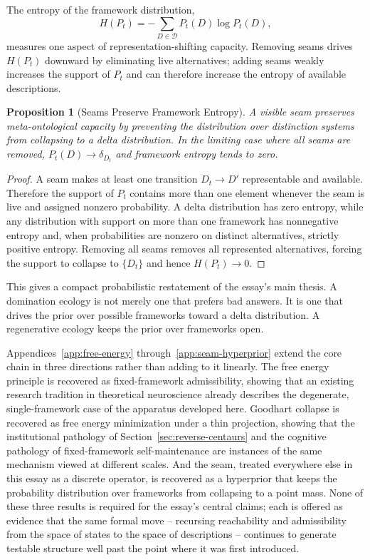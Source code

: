 \documentclass[11pt]{article}
\theoremstyle{plain}
\newtheorem{proposition}{Proposition}[section]
\begin{document}
The entropy of the framework distribution,
\[
H(P_t) = -\sum_{D \in \mathcal{D}} P_t(D) \log P_t(D),
\]
measures one aspect of representation-shifting capacity. Removing seams drives $H(P_t)$ downward by eliminating live alternatives; adding seams weakly increases the support of $P_t$ and can therefore increase the entropy of available descriptions.

\begin{proposition}[Seams Preserve Framework Entropy]
A visible seam preserves meta-ontological capacity by preventing the distribution over distinction systems from collapsing to a delta distribution. In the limiting case where all seams are removed, $P_t(D) \to \delta_{D_t}$ and framework entropy tends to zero.
\end{proposition}
\begin{proof}
A seam makes at least one transition $D_t \to D'$ representable and available. Therefore the support of $P_t$ contains more than one element whenever the seam is live and assigned nonzero probability. A delta distribution has zero entropy, while any distribution with support on more than one framework has nonnegative entropy and, when probabilities are nonzero on distinct alternatives, strictly positive entropy. Removing all seams removes all represented alternatives, forcing the support to collapse to $\{D_t\}$ and hence $H(P_t) \to 0$.
\end{proof}

This gives a compact probabilistic restatement of the essay's main thesis. A domination ecology is not merely one that prefers bad answers. It is one that drives the prior over possible frameworks toward a delta distribution. A regenerative ecology keeps the prior over frameworks open.

\noindent Appendices~\ref{app:free-energy} through~\ref{app:seam-hyperprior} extend the core chain in three directions rather than adding to it linearly. The free energy principle is recovered as fixed-framework admissibility, showing that an existing research tradition in theoretical neuroscience already describes the degenerate, single-framework case of the apparatus developed here. Goodhart collapse is recovered as free energy minimization under a thin projection, showing that the institutional pathology of Section~\ref{sec:reverse-centaurs} and the cognitive pathology of fixed-framework self-maintenance are instances of the same mechanism viewed at different scales. And the seam, treated everywhere else in this essay as a discrete operator, is recovered as a hyperprior that keeps the probability distribution over frameworks from collapsing to a point mass. None of these three results is required for the essay's central claims; each is offered as evidence that the same formal move -- recursing reachability and admissibility from the space of states to the space of descriptions -- continues to generate testable structure well past the point where it was first introduced.
\end{document}

